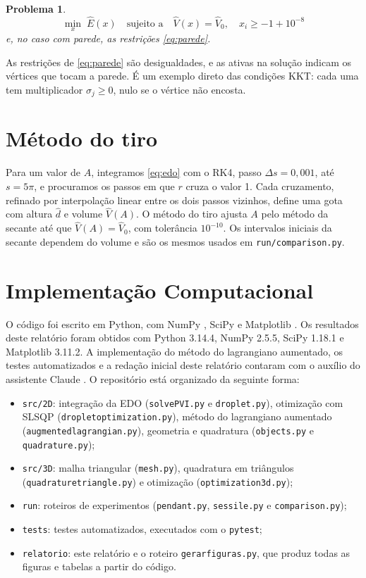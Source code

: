 \documentclass[12pt, oneside, a4paper, english, brazil]{abntex2}
\theoremstyle{relatorio}
\theoremstyle{relatorioit}
\theoremstyle{problema}
\newtheorem{problema}{Problema}[section]
\newcommand{\code}[1]{{\renewcommand{\_}{\textunderscore\allowbreak}\texttt{#1}}}
\newcommand{\Vh}{\hat V}
\newcommand{\dhat}{\hat d}
\newcommand{\Eh}{\hat E}
\begin{document}
\begin{problema}
\begin{equation}
  \min_{x} \; \Eh(x) \quad \text{sujeito a} \quad
  \Vh(x) = \Vh_0, \quad x_i \ge -1 + 10^{-8}
  \label{eq:problema-3d}
\end{equation}
e, no caso com parede, as restrições \eqref{eq:parede}.
\label{prob:3d}
\end{problema}

As restrições de \eqref{eq:parede} são desigualdades, e as ativas na solução indicam
os vértices que tocam a parede. É um exemplo direto das condições KKT: cada uma tem
multiplicador $\sigma_j \ge 0$, nulo se o vértice não encosta.

\section{Método do tiro}

Para um valor de $A$, integramos \eqref{eq:edo} com o RK4, passo $\Delta s = 0{,}001$,
até $s = 5\pi$, e procuramos os passos em que $r$ cruza o valor 1. Cada cruzamento,
refinado por interpolação linear entre os dois passos vizinhos, define uma gota com
altura $\dhat$ e volume $\Vh(A)$. O método do tiro ajusta $A$ pelo método da secante até
que $\Vh(A) = \Vh_0$, com tolerância $10^{-10}$. Os intervalos iniciais da secante
dependem do volume e são os mesmos usados em \code{run/comparison.py}.

\section{Implementação Computacional}

O código foi escrito em Python, com NumPy \parencite{harris2020}, SciPy
\parencite{virtanen2020} e Matplotlib \parencite{hunter2007}. Os resultados deste
relatório foram obtidos com Python 3.14.4, NumPy 2.5.5, SciPy 1.18.1 e
Matplotlib 3.11.2. A implementação do método do lagrangiano aumentado, os testes
automatizados e a redação inicial deste relatório contaram com o auxílio do assistente
Claude \parencite{claude2026}. O repositório está organizado da seguinte forma:

\begin{itemize}
  \item \code{src/2D}: integração da EDO (\code{solve\_PVI.py} e \code{droplet.py}),
    otimização com SLSQP (\code{droplet\_optimization.py}), método do lagrangiano
    aumentado (\code{augmented\_lagrangian.py}), geometria e quadratura
    (\code{objects.py} e \code{quadrature.py});
  \item \code{src/3D}: malha triangular (\code{mesh.py}), quadratura em triângulos
    (\code{quadrature\_triangle.py}) e otimização (\code{optimization\_3d.py});
  \item \code{run}: roteiros de experimentos (\code{pendant.py}, \code{sessile.py} e
    \code{comparison.py});
  \item \code{tests}: testes automatizados, executados com o \code{pytest};
  \item \code{relatorio}: este relatório e o roteiro \code{gerar\_figuras.py}, que
    produz todas as figuras e tabelas a partir do código.
\end{itemize}
\end{document}
